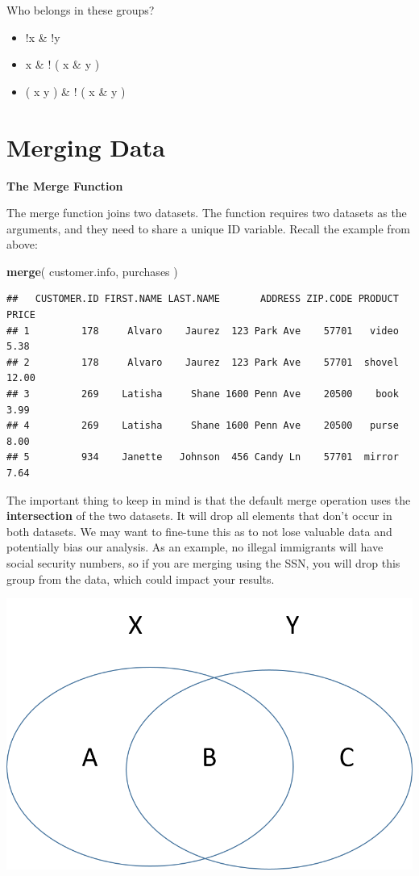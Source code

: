 \documentclass[]{book}
\newenvironment{Shaded}{\begin{snugshade}}{\end{snugshade}}
\newcommand{\KeywordTok}[1]{\textcolor[rgb]{0.13,0.29,0.53}{\textbf{#1}}}
\newcommand{\NormalTok}[1]{#1}
\providecommand{\tightlist}{%
  \setlength{\itemsep}{0pt}\setlength{\parskip}{0pt}}
\theoremstyle{definition}
\theoremstyle{definition}
\theoremstyle{definition}
\theoremstyle{remark}
\begin{document}
Who belongs in these groups?

\begin{itemize}
\tightlist
\item
  !x \& !y
\item
  x \& ! ( x \& y )
\item
  ( x \textbar{} y ) \& ! ( x \& y )
\end{itemize}

\hypertarget{merging-data-1}{%
\section{Merging Data}\label{merging-data-1}}

\textbf{The Merge Function}

The merge function joins two datasets. The function requires two
datasets as the arguments, and they need to share a unique ID variable.
Recall the example from above:

\begin{Shaded}
\begin{Highlighting}[]
\KeywordTok{merge}\NormalTok{( customer.info, purchases )}
\end{Highlighting}
\end{Shaded}

\begin{verbatim}
##   CUSTOMER.ID FIRST.NAME LAST.NAME       ADDRESS ZIP.CODE PRODUCT PRICE
## 1         178     Alvaro    Jaurez  123 Park Ave    57701   video  5.38
## 2         178     Alvaro    Jaurez  123 Park Ave    57701  shovel 12.00
## 3         269    Latisha     Shane 1600 Penn Ave    20500    book  3.99
## 4         269    Latisha     Shane 1600 Penn Ave    20500   purse  8.00
## 5         934    Janette   Johnson  456 Candy Ln    57701  mirror  7.64
\end{verbatim}

The important thing to keep in mind is that the default merge operation
uses the \textbf{intersection} of the two datasets. It will drop all
elements that don't occur in both datasets. We may want to fine-tune
this as to not lose valuable data and potentially bias our analysis. As
an example, no illegal immigrants will have social security numbers, so
if you are merging using the SSN, you will drop this group from the
data, which could impact your results.

\includegraphics{figures/xy.png}
\end{document}
